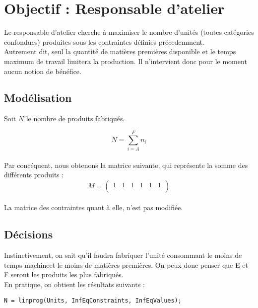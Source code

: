 \newpage
\section{Objectif : Responsable d'atelier}
Le responsable d'atelier cherche à maximiser le nombre d'unités (toutes
catégories confondues) produites sous les contraintes définies précedemment.\\
Autrement dit, seul la quantité de matières premières disponible et le temps
maximum de travail limitera la production. Il n'intervient donc pour le moment
aucun notion de bénéfice.

\subsection{Modélisation}
Soit $N$ le nombre de produits fabriqués.

\begin{equation}
	N = \sum_{i = A}^{F} n_i
\end{equation} 
~\\
Par concéquent, nous obtenons la matrice suivante, qui représente la somme des
différents produits :  
\begin{displaymath}
M = \left(
\begin{array}{cccccc}
1 & 1 & 1 & 1 & 1 & 1\\
\end{array}
\right)
\end{displaymath}
~\\
La matrice des contraintes quant à elle, n'est pas modifiée.

\subsection{Décisions}
Instinctivement, on sait qu'il faudra fabriquer l'unité consommant le moins de
\og temps machine\fg et le moins de matières premières. On peux donc penser que
E et F seront les produits les plus fabriqués.\\
En pratique, on obtient les résultats suivants :\\

\begin{lstlisting}
N = linprog(Units, InfEqConstraints, InfEqValues);
\end{lstlisting}


